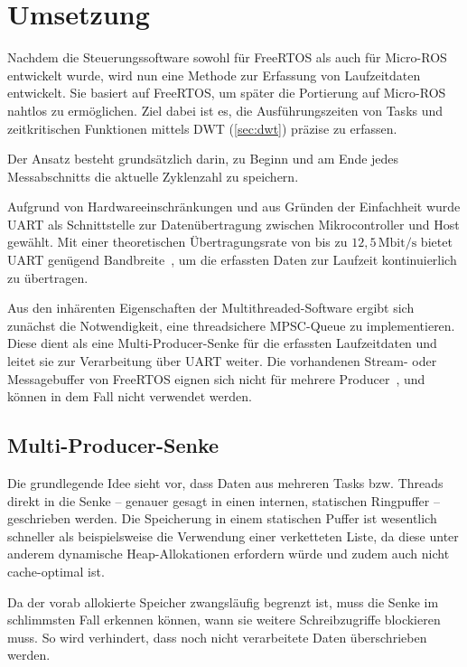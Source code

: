 \section{Umsetzung}

Nachdem die Steuerungssoftware sowohl für FreeRTOS als auch für Micro-ROS
entwickelt wurde, wird nun eine Methode zur Erfassung von Laufzeitdaten
entwickelt. Sie basiert auf FreeRTOS, um später die Portierung auf Micro-ROS
nahtlos zu ermöglichen. Ziel dabei ist es, die Ausführungszeiten von Tasks und
zeitkritischen Funktionen mittels DWT (\ref{sec:dwt}) präzise zu erfassen.

Der Ansatz besteht grundsätzlich darin, zu Beginn und am Ende jedes
Messabschnitts die aktuelle Zyklenzahl zu speichern.

Aufgrund von Hardwareeinschränkungen und aus Gründen der Einfachheit wurde UART
als Schnittstelle zur Datenübertragung zwischen Mikrocontroller und Host
gewählt. Mit einer theoretischen Übertragungsrate von bis zu
$12,5\,\text{Mbit/s}$ bietet UART genügend Bandbreite~\cite[S.
2]{stm32_datasheet}, um die erfassten Daten zur Laufzeit kontinuierlich zu
übertragen.

Aus den inhärenten Eigenschaften der Multithreaded-Software ergibt sich zunächst
die Notwendigkeit, eine threadsichere \ac{MPSC}-Queue zu implementieren. Diese
dient als eine Multi-Producer-Senke für die erfassten Laufzeitdaten und leitet
sie zur Verarbeitung über UART weiter. Die vorhandenen Stream- oder
Messagebuffer von FreeRTOS eignen sich nicht für mehrere
Producer~\cite{FreeRTOSStreamBuffer}, und können in dem Fall nicht verwendet
werden.

\subsection{Multi-Producer-Senke}

Die grundlegende Idee sieht vor, dass Daten aus mehreren Tasks bzw. Threads
direkt in die Senke -- genauer gesagt in einen internen, statischen Ringpuffer
-- geschrieben werden. Die Speicherung in einem statischen Puffer ist wesentlich
schneller als beispielsweise die Verwendung einer verketteten Liste, da diese
unter anderem dynamische Heap-Allokationen erfordern würde und zudem auch nicht
cache-optimal ist.

Da der vorab allokierte Speicher zwangsläufig begrenzt ist, muss die Senke im
schlimmsten Fall erkennen können, wann sie weitere Schreibzugriffe blockieren
muss. So wird verhindert, dass noch nicht verarbeitete Daten überschrieben
werden.

